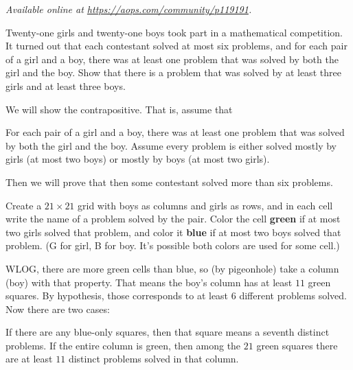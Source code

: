 \textsl{Available online at \url{https://aops.com/community/p119191}.}
\begin{mdframed}[style=mdpurplebox,frametitle={Problem statement}]
Twenty-one girls and twenty-one boys took part in a mathematical competition.
It turned out that each contestant solved at most six problems,
and for each pair of a girl and a boy,
there was at least one problem that was solved by both the girl and the boy.
Show that there is a problem that was solved by at least three girls and at least three boys.
\end{mdframed}
We will show the contrapositive.
That is, assume that
\begin{itemize}
  \ii For each pair of a girl and a boy,
  there was at least one problem that was
  solved by both the girl and the boy.
  \ii Assume every problem is either solved
  mostly by girls (at most two boys)
  or mostly by boys (at most two girls).
\end{itemize}
Then we will prove that then some contestant
solved more than six problems.

Create a $21 \times 21$ grid with boys as columns
and girls as rows, and in each cell
write the name of a problem solved by the pair.
Color the cell \textbf{green} if at most two girls solved that problem,
and color it \textbf{blue} if at most two boys solved that problem.
(G for girl, B for boy.
It's possible both colors are used for some cell.)

WLOG, there are more green cells than blue,
so (by pigeonhole) take a column (boy) with that property.
That means the boy's column has at least $11$ green squares.
By hypothesis, those corresponds to at least $6$ different problems
solved. Now there are two cases:
\begin{itemize}
  \ii If there are any blue-only squares,
  then that square means a seventh distinct problems.
  \ii If the entire column is green,
  then among the $21$ green squares
  there are at least $11$ distinct problems solved
  in that column.
\end{itemize}

